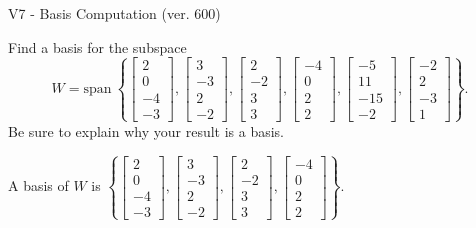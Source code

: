 \begin{exercise}
  \begin{exerciseTitle}V7 - Basis Computation (ver. 600)\end{exerciseTitle}
  \begin{exerciseStatement}
    Find a basis for the subspace 
\[W=\mathrm{span}\ \left\{\left[\begin{array}{r}
2 \\
0 \\
-4 \\
-3
\end{array}\right] , \left[\begin{array}{r}
3 \\
-3 \\
2 \\
-2
\end{array}\right] , \left[\begin{array}{r}
2 \\
-2 \\
3 \\
3
\end{array}\right] , \left[\begin{array}{r}
-4 \\
0 \\
2 \\
2
\end{array}\right] , \left[\begin{array}{r}
-5 \\
11 \\
-15 \\
-2
\end{array}\right] , \left[\begin{array}{r}
-2 \\
2 \\
-3 \\
1
\end{array}\right]\right\}.\]
 Be sure to explain why your result is a basis.


  \end{exerciseStatement}
  \begin{exerciseAnswer}
   A basis of \(W\) is  \(\left\{\left[\begin{array}{r}
2 \\
0 \\
-4 \\
-3
\end{array}\right] , \left[\begin{array}{r}
3 \\
-3 \\
2 \\
-2
\end{array}\right] , \left[\begin{array}{r}
2 \\
-2 \\
3 \\
3
\end{array}\right] , \left[\begin{array}{r}
-4 \\
0 \\
2 \\
2
\end{array}\right]\right\}\).
  


  \end{exerciseAnswer}
\end{exercise}